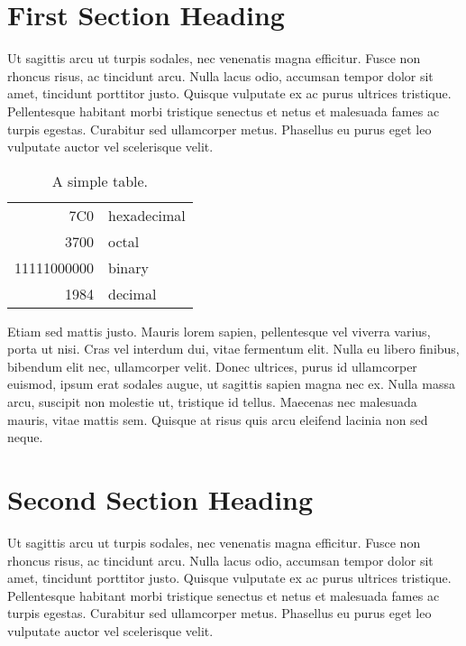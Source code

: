 \documentclass{acmsiggraph}
\begin{document}
\keywordlist

\conceptlist

\printcopyright

\section{First Section Heading}

Ut sagittis arcu ut turpis sodales, nec venenatis magna efficitur. Fusce non rhoncus risus, ac tincidunt arcu. Nulla lacus odio, accumsan tempor dolor sit amet, tincidunt porttitor justo. Quisque vulputate ex ac purus ultrices tristique. Pellentesque habitant morbi tristique senectus et netus et malesuada fames ac turpis egestas. Curabitur sed ullamcorper metus. Phasellus eu purus eget leo vulputate auctor vel scelerisque velit.

\begin{table}[ht]
  \centering
  \caption{A simple table.}
  \begin{tabular}{|r|l|}
    \hline
    7C0 & hexadecimal \\
    3700 & octal \\ \cline{2-2}
    11111000000 & binary \\
    \hline \hline
    1984 & decimal \\
    \hline
  \end{tabular}
\end{table}
  
Etiam sed mattis justo. Mauris lorem sapien, pellentesque vel viverra varius, porta ut nisi. Cras vel interdum dui, vitae fermentum elit. Nulla eu libero finibus, bibendum elit nec, ullamcorper velit. Donec ultrices, purus id ullamcorper euismod, ipsum erat sodales augue, ut sagittis sapien magna nec ex. Nulla massa arcu, suscipit non molestie ut, tristique id tellus. Maecenas nec malesuada mauris, vitae mattis sem. Quisque at risus quis arcu eleifend lacinia non sed neque.

\section{Second Section Heading}

Ut sagittis arcu ut turpis sodales, nec venenatis magna efficitur. Fusce non rhoncus risus, ac tincidunt arcu. Nulla lacus odio, accumsan tempor dolor sit amet, tincidunt porttitor justo. Quisque vulputate ex ac purus ultrices tristique. Pellentesque habitant morbi tristique senectus et netus et malesuada fames ac turpis egestas. Curabitur sed ullamcorper metus. Phasellus eu purus eget leo vulputate auctor vel scelerisque velit.
\end{document}
